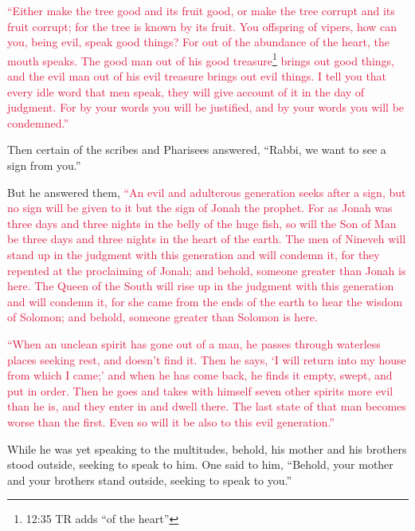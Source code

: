 \myverse{}\textcolor{crimson}{“Either make the tree good and its fruit good, or make the
	tree corrupt and its fruit corrupt; for the tree is known by its fruit.
}
\myverse{}\textcolor{crimson}{You offspring of vipers, how can you, being evil, speak good things?
	For out of the abundance of the heart, the mouth speaks.
}
\myverse{}\textcolor{crimson}{The good man out of his good treasure}\footnote{12:35 TR adds “of the heart”}
\textcolor{crimson}{brings out good things, and the evil man out of his evil treasure brings out evil things.
}
\myverse{}\textcolor{crimson}{I tell you that every idle word that men speak, they will give account
	of it in the day of judgment.
}
\myverse{}\textcolor{crimson}{For by your words you will be justified, and by your words you will be
	condemned.”}

\myverse{}Then certain of the scribes and Pharisees answered, “Rabbi,
we want to see a sign from you.”

\myverse{}But he answered them,
\textcolor{crimson}{“An evil and adulterous generation seeks after a sign, but no sign will be given to it but the sign
	of Jonah the prophet.
}
\myverse{}\textcolor{crimson}{For as Jonah was three days and three nights in the belly of the huge
	fish, so will the Son of Man be three days and three nights in the heart of the earth.
}
\myverse{}\textcolor{crimson}{The men of Nineveh will stand up in the judgment with this generation
	and will condemn it, for they repented at the proclaiming of Jonah; and behold, someone greater than Jonah
	is here.
}
\myverse{}\textcolor{crimson}{The Queen of the South will rise up in the judgment with this generation
	and will condemn it, for she came from the ends of the earth to hear the wisdom of Solomon; and behold,
	someone greater than Solomon is here.
}

\myverse{}\textcolor{crimson}{“When an unclean spirit has gone out of a man, he passes
	through waterless places seeking rest, and doesn’t find it.
}
\myverse{}\textcolor{crimson}{Then he says, ‘I will return into my house from which I came;’ and when
	he has come back, he finds it empty, swept, and put in order.
}
\myverse{}\textcolor{crimson}{Then he goes and takes with himself seven other spirits more evil than
	he is, and they enter in and dwell there. The last state of that man becomes worse than the first. Even
	so will it be also to this evil generation.”}

\myverse{}While he was yet speaking to the multitudes, behold, his mother
and his brothers stood outside, seeking to speak to him.
\myverse{}One said to him, “Behold, your mother and your brothers stand outside, seeking
to speak to you.”

